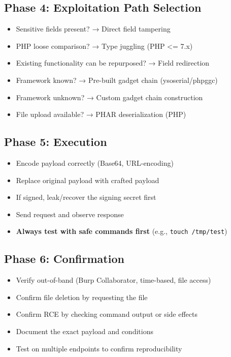 \documentclass[11pt]{article}
\begin{document}
\begin{checklistbox}
\subsection*{Phase 4: Exploitation Path Selection}
\begin{itemize}
    \item[$\square$] Sensitive fields present? → Direct field tampering
    \item[$\square$] PHP loose comparison? → Type juggling (PHP <= 7.x)
    \item[$\square$] Existing functionality can be repurposed? → Field redirection
    \item[$\square$] Framework known? → Pre-built gadget chain (ysoserial/phpggc)
    \item[$\square$] Framework unknown? → Custom gadget chain construction
    \item[$\square$] File upload available? → PHAR deserialization (PHP)
\end{itemize}

\subsection*{Phase 5: Execution}
\begin{itemize}
    \item[$\square$] Encode payload correctly (Base64, URL-encoding)
    \item[$\square$] Replace original payload with crafted payload
    \item[$\square$] If signed, leak/recover the signing secret first
    \item[$\square$] Send request and observe response
    \item[$\square$] \textbf{Always test with safe commands first} (e.g., \texttt{touch /tmp/test})
\end{itemize}

\subsection*{Phase 6: Confirmation}
\begin{itemize}
    \item[$\square$] Verify out-of-band (Burp Collaborator, time-based, file access)
    \item[$\square$] Confirm file deletion by requesting the file
    \item[$\square$] Confirm RCE by checking command output or side effects
    \item[$\square$] Document the exact payload and conditions
    \item[$\square$] Test on multiple endpoints to confirm reproducibility
\end{itemize}
\end{checklistbox}
\end{document}
